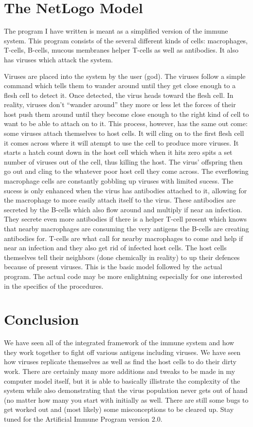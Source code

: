 \documentclass[12pt ]{report}
\begin{document}
\section*{The NetLogo Model}
The program I have written is meant as a simplified version of the immune system.  This program consists of the several different kinds of cells:  macrophages, T-cells, B-cells, mucous membranes helper T-cells as well as antibodies. It also has viruses which attack the system.

Viruses are placed into the system by the user (god).  The viruses follow a simple command which tells them to wander around until they get close enough to a flesh cell to detect it.  Once detected, the virus heads toward the flesh cell.  In reality, viruses don't "`wander around"' they more or less let the forces of their host push them around until they become close enough to the right kind of cell to want to be able to attach on to it.  This process, however, has the same out come: some viruses attach themselves to host cells.  It will cling on to the first flesh cell it comes across where it will atempt to use the cell to produce more viruses.  It starts a hatch count down in the host cell which when it hits zero spits a set number of viruses out of the cell, thus killing the host.  The virus' offspring then go out and cling to the whatever poor host cell they come across.  The everflowing macrophage cells are constantly gobbling up viruses with limited sucess.  The sucess is only enhanced when the virus has antibodies attached to it, allowing for the macrophage to more easily attach itself to the virus.  These antibodies are secreted by the B-cells which also flow around and multiply if near an infection.  They secrete even more antibodies if there is a helper T-cell present which knows that nearby macrophages are consuming the very antigens the B-cells are creating antibodies for.  T-cells are what call for nearby macrophages to come and help if near an infection and they also get rid of infected host cells.  The host cells themselves tell their neighbors (done chemically in reality) to up their defences because of present viruses.  This is the basic model followed by the actual program.  The actual code may be more enlightning especially for one interested in the specifics of the procedures.
\section*{Conclusion}
We have seen all of the integrated framework of the immune system and how they work together to fight off various antigens including viruses.  We have seen how viruses replicate themselves as well as find the host cells to do their dirty work.  There are certainly many more additions and tweaks to be made in my computer model itself, but it is able to basically illistrate the complexity of the system while also demonstrating that the virus population never gets out of hand (no matter how many you start with initially as well.  There are still some bugs to get worked out and (most likely) some misconceptions to be cleared up.  Stay tuned for the Artificial Immune Program version 2.0.
\end{document}
